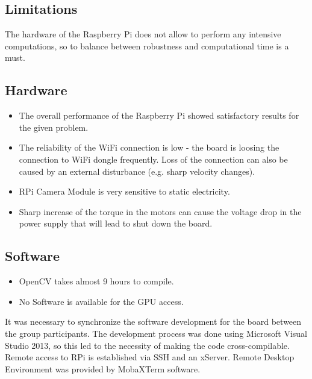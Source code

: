 \subsection{Limitations}

The hardware of the Raspberry Pi does not allow to perform any intensive
computations, so to balance between robustness and computational time is a must.

\subsection{Hardware}

\begin{itemize}
  	\item The overall performance of the Raspberry Pi showed satisfactory results for the given problem.
  	\item The reliability of the WiFi connection is low - the board is loosing the connection to WiFi dongle frequently. Loss of the connection can also be caused by an external disturbance (e.g. sharp velocity changes).
	\item RPi Camera Module is very sensitive to static electricity.
	\item Sharp increase of the torque in the motors can cause the voltage drop in
	the power supply that will lead to shut down the board.
\end{itemize}

\subsection{Software}

\begin{itemize}
  \item OpenCV takes almost 9 hours to compile.
  \item No Software is available for the GPU access.
\end{itemize}

It was necessary to synchronize the software development for the board between
the group participants. The development process was done using Microsoft Visual Studio 2013, so this led to the necessity of making the code
cross-compilable. 
Remote access to RPi is established via SSH and an xServer.
Remote Desktop Environment was provided by MobaXTerm software.
